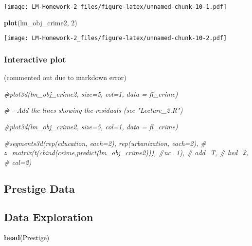 \documentclass[
]{article}
\newenvironment{Shaded}{\begin{snugshade}}{\end{snugshade}}
\newcommand{\CommentTok}[1]{\textcolor[rgb]{0.56,0.35,0.01}{\textit{#1}}}
\newcommand{\DecValTok}[1]{\textcolor[rgb]{0.00,0.00,0.81}{#1}}
\newcommand{\KeywordTok}[1]{\textcolor[rgb]{0.13,0.29,0.53}{\textbf{#1}}}
\newcommand{\NormalTok}[1]{#1}
\begin{document}
\texttt{[image: LM-Homework-2\_files/figure-latex/unnamed-chunk-10-1.pdf]}

\begin{Shaded}
\begin{Highlighting}[]
\KeywordTok{plot}\NormalTok{(lm_obj_crime2, }\DecValTok{2}\NormalTok{)}
\end{Highlighting}
\end{Shaded}

\texttt{[image: LM-Homework-2\_files/figure-latex/unnamed-chunk-10-2.pdf]}

\hypertarget{interactive-plot}{%
\subsubsection{Interactive plot}\label{interactive-plot}}

(commented out due to markdown error)

\begin{Shaded}
\begin{Highlighting}[]
\CommentTok{#plot3d(lm_obj_crime2, size=5, col=1, data = fl_crime)}

\CommentTok{# - Add the lines showing the residuals (see "Lecture_2.R")}

\CommentTok{#plot3d(lm_obj_crime2, size=5, col=1, data = fl_crime)}

\CommentTok{#segments3d(rep(education, each=2), rep(urbanization, each=2), }
\CommentTok{#           z=matrix(t(cbind(crime,predict(lm_obj_crime2))), #nc=1), }
\CommentTok{#           add=T, }
\CommentTok{#           lwd=2, }
\CommentTok{#           col=2)}
\end{Highlighting}
\end{Shaded}

\hypertarget{prestige-data}{%
\subsection{Prestige Data}\label{prestige-data}}

\hypertarget{data-exploration}{%
\subsection{Data Exploration}\label{data-exploration}}

\begin{Shaded}
\begin{Highlighting}[]
\KeywordTok{head}\NormalTok{(Prestige)}
\end{Highlighting}
\end{Shaded}
\end{document}
